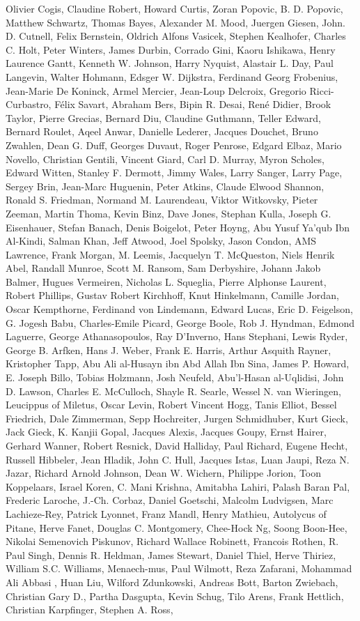 \begin{spacing}{0.5}
\begin{tiny}
Olivier Cogis, Claudine Robert, Howard Curtis, Zoran Popovic, B. D. Popovic, Matthew Schwartz, Thomas Bayes, Alexander M. Mood, Juergen Giesen, John. D. Cutnell, Felix Bernstein, Oldrich Alfons Vasicek, Stephen Kealhofer, Charles C. Holt, Peter Winters, James Durbin, Corrado Gini, Kaoru Ishikawa, Henry Laurence Gantt, Kenneth W. Johnson, Harry Nyquist, Alastair L. Day, Paul Langevin, Walter Hohmann, Edsger W. Dijkstra, Ferdinand Georg Frobenius, Jean-Marie De Koninck, Armel Mercier, Jean-Loup Delcroix, Gregorio Ricci-Curbastro, Félix Savart, Abraham Bers, Bipin R. Desai, René Didier, Brook Taylor, Pierre Grecias, Bernard Diu, Claudine Guthmann, Teller Edward, Bernard Roulet, Aqeel Anwar, Danielle Lederer, Jacques Douchet, Bruno Zwahlen, Dean G. Duff, Georges Duvaut, Roger Penrose, Edgard Elbaz, Mario Novello, Christian Gentili, Vincent Giard, Carl D. Murray, Myron Scholes, Edward Witten, Stanley F. Dermott, Jimmy Wales, Larry Sanger, Larry Page, Sergey Brin, Jean-Marc Huguenin, Peter Atkins, Claude Elwood Shannon, Ronald S. Friedman, Normand M. Laurendeau, Viktor Witkovsky, Pieter Zeeman, Martin Thoma, Kevin Binz, Dave Jones, Stephan Kulla, Joseph G. Eisenhauer, Stefan Banach, Denis Boigelot, Peter Hoyng, Abu Yusuf Ya'qub Ibn Al-Kindi, Salman Khan, Jeff Atwood, Joel Spolsky, Jason Condon, AMS Lawrence, Frank Morgan, M. Leemis, Jacquelyn T. McQueston, Niels Henrik Abel, Randall Munroe, Scott M. Ransom, Sam Derbyshire, Johann Jakob Balmer, Hugues Vermeiren, Nicholas L. Squeglia, Pierre Alphonse Laurent, Robert Phillips, Gustav Robert Kirchhoff, Knut Hinkelmann, Camille Jordan, Oscar Kempthorne, Ferdinand von Lindemann, Edward Lucas, Eric D. Feigelson, G. Jogesh Babu, Charles-Emile Picard, George Boole, Rob J. Hyndman, Edmond Laguerre, George Athanasopoulos, Ray D'Inverno, Hans Stephani, Lewis Ryder, George B. Arfken, Hans J. Weber, Frank E. Harris, Arthur Asquith Rayner, Kristopher Tapp, Abu Ali al-Husayn ibn Abd Allah Ibn Sina, James P. Howard, E. Joseph Billo, Tobias Holzmann, Josh Neufeld, Abu'l-Hasan al-Uqlidisi, John D. Lawson, Charles E. McCulloch, Shayle R. Searle, Wessel N. van Wieringen, Leucippus of Miletus, Oscar Levin, Robert Vincent Hogg, Tanis Elliot, Bessel Friedrich, Dale Zimmerman, Sepp Hochreiter, Jurgen Schmidhuber, Kurt Gieck, Jack Gieck, K. Kanjii Gopal, Jacques Alexis, Jacques Goupy, Ernst Hairer, Gerhard Wanner, Robert Resnick, David Halliday, Paul Richard, Eugene Hecht, Russell Hibbeler, Jean Hladik, John C. Hull, Jacques Istas, Luan Jaupi, Reza N. Jazar, Richard Arnold Johnson, Dean W. Wichern, Philippe Jorion, Toon Koppelaars, Israel Koren, C. Mani Krishna, Amitabha Lahiri, Palash Baran Pal, Frederic Laroche, J.-Ch. Corbaz, Daniel Goetschi, Malcolm Ludvigsen, Marc Lachieze-Rey, Patrick Lyonnet, Franz Mandl, Henry Mathieu, Autolycus of Pitane, Herve Fanet, Douglas C. Montgomery, Chee-Hock Ng, Soong Boon-Hee, Nikolai Semenovich Piskunov, Richard Wallace Robinett, Francois Rothen, R. Paul Singh, Dennis R. Heldman, James Stewart, Daniel Thiel, Herve Thiriez, William S.C. Williams, Menaech-mus, Paul Wilmott, Reza Zafarani, Mohammad Ali Abbasi , Huan Liu, Wilford Zdunkowski, Andreas Bott, Barton Zwiebach, Christian Gary D., Partha Dasgupta, Kevin Schug, Tilo Arens, Frank Hettlich, Christian Karpfinger, Stephen A. Ross, 
\end{tiny}
\end{spacing}
